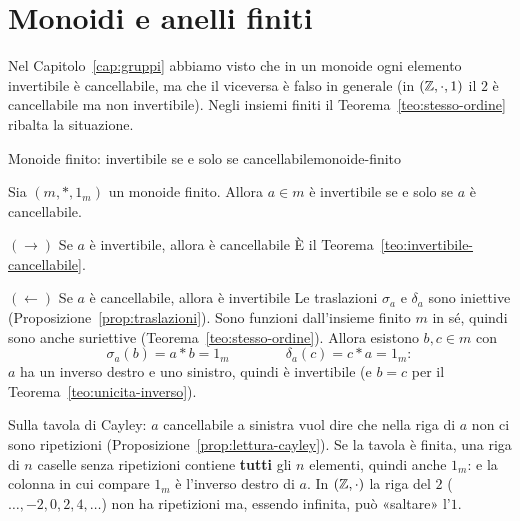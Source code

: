 \section{Monoidi e anelli finiti}\label{sec:monoidi-finiti}

Nel Capitolo~\ref{cap:gruppi} abbiamo visto che in un monoide ogni elemento invertibile è cancellabile, ma che il viceversa è
falso in generale (in $(\mathbb{Z}, \cdot, 1)$ il $2$ è cancellabile ma non invertibile). Negli insiemi finiti il
Teorema~\ref{teo:stesso-ordine} ribalta la situazione.

\begin{concetto}
\begin{Teorema}{Monoide finito: invertibile se e solo se cancellabile}{monoide-finito}
    \begin{prerequisiti}
    \end{prerequisiti}
    Sia $(m, *, 1_m)$ un monoide finito. Allora $a \in m$ è invertibile se e solo se $a$ è cancellabile.
\end{Teorema}
\begin{dimostrazione}
    \begin{caso}{$(\rightarrow)$ Se $a$ è invertibile, allora è cancellabile}
        È il Teorema~\ref{teo:invertibile-cancellabile}.
    \end{caso}
    \begin{caso}{$(\leftarrow)$ Se $a$ è cancellabile, allora è invertibile}
        Le traslazioni $\sigma_a$ e $\delta_a$ sono iniettive (Proposizione~\ref{prop:traslazioni}). Sono funzioni dall'insieme finito $m$ in sé,
        quindi sono anche suriettive (Teorema~\ref{teo:stesso-ordine}). Allora esistono $b, c \in m$ con
        \[ \sigma_a(b) = a * b = 1_m \qquad\qquad \delta_a(c) = c * a = 1_m: \]
        $a$ ha un inverso destro e uno sinistro, quindi è invertibile (e $b = c$ per il Teorema~\ref{teo:unicita-inverso}).
    \end{caso}
\end{dimostrazione}
\end{concetto}

\begin{spiegazione}
    Sulla tavola di Cayley: $a$ cancellabile a sinistra vuol dire che nella riga di $a$ non ci sono ripetizioni
    (Proposizione~\ref{prop:lettura-cayley}). Se la tavola è finita, una riga di $n$ caselle senza ripetizioni contiene
    \textbf{tutti} gli $n$ elementi, quindi anche $1_m$: e la colonna in cui compare $1_m$ è l'inverso destro di $a$. In $(\mathbb{Z}, \cdot)$ la
    riga del $2$ ($\dots, -2, 0, 2, 4, \dots$) non ha ripetizioni ma, essendo infinita, può «saltare» l'$1$.
\end{spiegazione}

